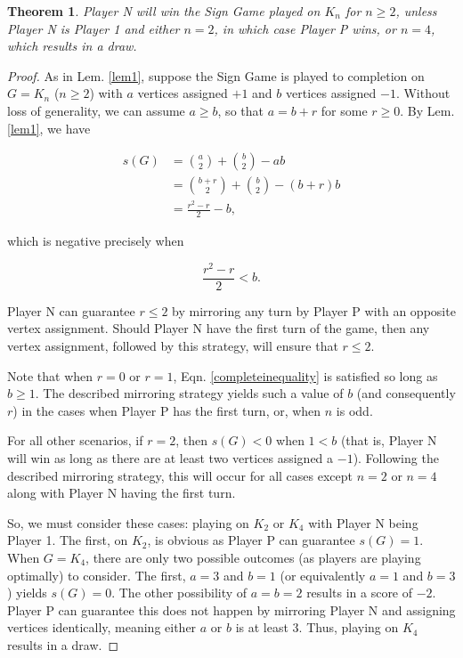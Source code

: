 \documentclass[amsart,11pt]{article}
\theoremstyle{dotless}
\theoremstyle{dotless}
\newtheorem{thm}{Theorem}[section]
\begin{document}
\begin{thm} \label{thm1}
    Player N will win the Sign Game played on $K_n$ for $n\geq 2$, unless Player N is Player 1 and either $n=2$, in which case Player P wins, or $n=4$, which results in a draw.
\end{thm}
\begin{proof}
    As in Lem. \ref{lem1}, suppose the Sign Game is played to completion on $G=K_n$ ($n \geq 2$) with $a$ vertices assigned $+1$ and $b$ vertices assigned $-1$. Without loss of generality, we can assume $a \geq b$, so that $a = b+r$ for some $r \geq 0$. By Lem. \ref{lem1}, we have

    \begin{align}
        s(G) &= \binom{a}{2} + \binom{b}{2} -ab \\
        &= \binom{b+r}{2} + \binom{b}{2}-(b+r)b \\
        &=\frac{r^2-r}{2}-b,
    \end{align}

    
    \noindent which is negative precisely when 

    \begin{equation} \label{completeinequality}
         \frac{r^2-r}{2}<b.
    \end{equation}

    Player N can guarantee $r \leq 2$ by mirroring any turn by Player P with an opposite vertex assignment. Should Player N have the first turn of the game, then any vertex assignment, followed by this strategy, will ensure that $r \leq 2$.

    Note that when $r=0$ or $r=1$, Eqn. \ref{completeinequality} is satisfied so long as $b \geq 1$. The described mirroring strategy yields such a value of $b$ (and consequently $r$) in the cases when Player P has the first turn, or, when $n$ is odd.

    For all other scenarios, if $r=2$, then $s(G) < 0$ when $1 < b$ (that is, Player N will win as long as there are at least two vertices assigned a $-1$). Following the described mirroring strategy, this will occur for all cases except $n =2$ or $n=4$ along with Player N having the first turn.

    So, we must consider these cases: playing on $K_2$ or $K_4$ with Player N being Player 1. The first, on $K_2$, is obvious as Player P can guarantee $s(G)=1$. When $G = K_4$, there are only two possible outcomes (as players are playing optimally) to consider. The first, $a = 3$ and $b =1$ (or equivalently $a = 1$ and $b = 3$) yields $s(G) = 0$. The other possibility of $a = b = 2$ results in a score of $-2$. Player P can guarantee this does not happen by mirroring Player N and assigning vertices identically, meaning either $a$ or $b$ is at least $3$. Thus, playing on $K_4$ results in a draw.
\end{proof}
\end{document}
